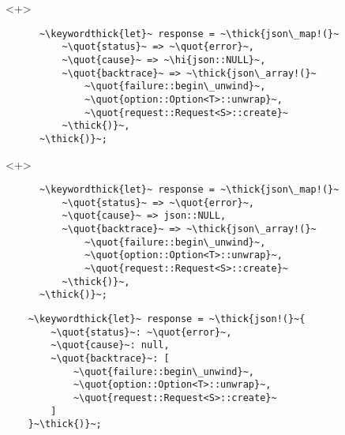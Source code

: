 \documentclass[usepdftitle=false]{beamer}
\newcommand{\thick}[1]{\contourlength{0.16pt}\contour[10]{black}{#1}}
\newcommand{\slantbox}[2][.5]
  {%
    \mbox
      {%
        \sbox{\foobox}{#2}%
        \hskip\wd\foobox
        \pdfsave
        \pdfsetmatrix{1 0 #1 1}%
        \llap{\usebox{\foobox}}%
        \pdfrestore
      }%
  }
\newcommand{\backslantbox}[2][.5]
  {%
    \mbox
      {%
        \sbox{\foobox}{#2}%
        \hskip\wd\foobox
        \pdfsave
        \pdfsetmatrix{-1 0 #1 1}%
        \llap{\usebox{\foobox}}%
        \pdfrestore
      }%
  }
\newcommand{\hi}[1]{%
\tikz[baseline=(A.base)]
 \node[highlighting=yellowbg,inner sep=0pt,text depth=0pt] (A) {#1};%
}
\newcommand{\openquote}{\backslantbox[.2]{\hspace{11pt}''\hspace{-11pt}}}
\newcommand{\closequote}{\slantbox[-.2]{\hspace{2pt}''\hspace{-2pt}}}
\newcommand{\blackquote}[1]{\openquote#1\closequote}
\newcommand{\quot}[1]{{\color{redish}\blackquote{#1}}}
\newcommand{\keywordthick}[1]{\color{greenish}\contourlength{0.20pt}\contour[10]{greenish}{#1}}
\begin{document}
\begin{frame}[fragile]
  \begin{onlyenv}<+>
    \begin{verbatim}
      ~\keywordthick{let}~ response = ~\thick{json\_map!(}~
          ~\quot{status}~ => ~\quot{error}~,
          ~\quot{cause}~ => ~\hi{json::NULL}~,
          ~\quot{backtrace}~ => ~\thick{json\_array!(}~
              ~\quot{failure::begin\_unwind}~,
              ~\quot{option::Option<T>::unwrap}~,
              ~\quot{request::Request<S>::create}~
          ~\thick{)}~,
      ~\thick{)}~;
    \end{verbatim}
  \end{onlyenv}
  \begin{onlyenv}<+>
    \begin{verbatim}
      ~\keywordthick{let}~ response = ~\thick{json\_map!(}~
          ~\quot{status}~ => ~\quot{error}~,
          ~\quot{cause}~ => json::NULL,
          ~\quot{backtrace}~ => ~\thick{json\_array!(}~
              ~\quot{failure::begin\_unwind}~,
              ~\quot{option::Option<T>::unwrap}~,
              ~\quot{request::Request<S>::create}~
          ~\thick{)}~,
      ~\thick{)}~;
    \end{verbatim}
  \end{onlyenv}
\end{frame}

\begin{frame}[fragile]
  \begin{verbatim}
    ~\keywordthick{let}~ response = ~\thick{json!(}~{
        ~\quot{status}~: ~\quot{error}~,
        ~\quot{cause}~: null,
        ~\quot{backtrace}~: [
            ~\quot{failure::begin\_unwind}~,
            ~\quot{option::Option<T>::unwrap}~,
            ~\quot{request::Request<S>::create}~
        ]
    }~\thick{)}~;
  \end{verbatim}
\end{frame}
\end{document}
